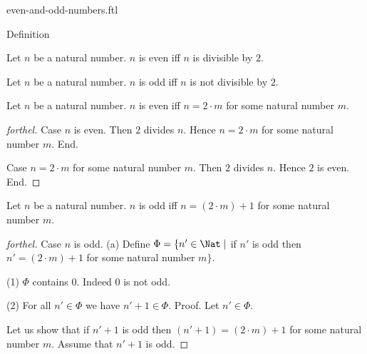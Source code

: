 \documentclass{naproche-library}
\begin{document}
\begin{smodule}[title=Even and Odd Numbers]{even-and-odd-numbers.ftl}

\begin{sfragment}{Definition}
  \begin{definition}[forthel,id=ARITHMETIC_15_4521358965847512]
    Let $n$ be a natural number.
    $n$ is even iff $n$ is divisible by $2$.
  \end{definition}

  \begin{definition}[forthel,id=ARITHMETIC_15_1023652125874596]
    Let $n$ be a natural number.
    $n$ is odd iff $n$ is not divisible by $2$.
  \end{definition}

  \begin{proposition}[forthel,id=ARITHMETIC_15_0236985458752156]
    Let $n$ be a natural number.
    $n$ is even iff $n = 2 \cdot m$ for some natural number $m$.
  \end{proposition}
  \begin{proof}[forthel]
    Case $n$ is even.
      Then $2$ divides $n$.
      Hence $n = 2 \cdot m$ for some natural number $m$.
    End.

    Case $n = 2 \cdot m$ for some natural number $m$.
      Then $2$ divides $n$.
      Hence $2$ is even.
    End.
  \end{proof}

  \begin{proposition}[forthel,id=ARITHMETIC_15_1023512547854265]
    Let $n$ be a natural number.
    $n$ is odd iff $n = (2 \cdot m) + 1$ for some natural number $m$.
  \end{proposition}
  \begin{proof}[forthel]
    Case $n$ is odd.
      (a) Define $\Phi = \{ n' \in \Nat \mid$ if $n'$ is odd then $n' = (2 \cdot m) + 1$ for some natural number $m \}$.

      (1) $\Phi$ contains $0$.
      Indeed $0$ is not odd.

      (2) For all $n' \in \Phi$ we have $n' + 1 \in \Phi$. \newline
      Proof.
        Let $n' \in \Phi$.

        Let us show that if $n' + 1$ is odd then $(n' + 1) = (2 \cdot m) + 1$ for some natural number $m$.
          Assume that $n' + 1$ is odd.


\end{proof}
\end{sfragment}
\end{smodule}
\end{document}
